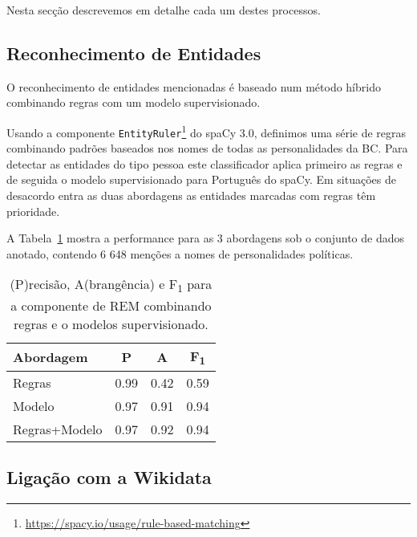 \documentclass[a4paper, twocolumn, 11pt, twoside]{article}
\begin{document}
Nesta secção descrevemos em detalhe cada um destes processos.

\subsection{Reconhecimento de Entidades}
\label{subsec:ner}


O reconhecimento de entidades mencionadas é baseado num método híbrido combinando regras com um modelo supervisionado. 

Usando a componente \texttt{EntityRuler}\footnote{\url{https://spacy.io/usage/rule-based-matching}} do spaCy 3.0, definimos uma série de regras combinando padrões baseados nos nomes de todas as personalidades da BC. Para detectar as entidades do tipo pessoa este classificador aplica primeiro as regras e de seguida o modelo supervisionado para Português do spaCy. Em situações de desacordo entra as duas abordagens as entidades marcadas com regras têm prioridade.

A Tabela~\ref{tab:results_ner} mostra a performance para as 3 abordagens sob o conjunto de dados anotado, contendo 6 648 menções a nomes de personalidades políticas.


\begin{table}[!h]
    \begin{center}
    \begin{tabular}{l ccc}
		{\bf Abordagem}  & {\bf P} & {\bf A} & {\bf F\textsubscript{1}} \\
        \hline
        Regras           &  0.99     &  0.42     & 		0.59		\\
        Modelo           &  0.97     &  0.91     & 		0.94		\\
		Regras+Modelo    &  0.97     &  0.92     & 		0.94		\\
    \end{tabular}
	\caption{ (P)recisão, A(brangência) e F\textsubscript{1} para a componente de REM combinando regras e o modelos supervisionado.}	
	\label{tab:results_ner}
	\end{center}
\end{table}

\subsection{Ligação com a Wikidata}
\label{subsec:ent_linking}
\end{document}

